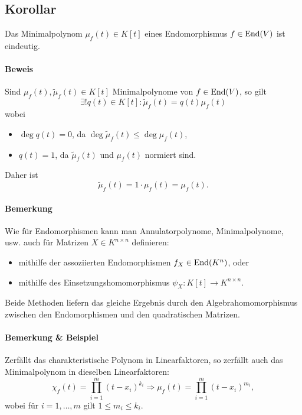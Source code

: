 \subsection{Korollar}
\begin{Korollar}
	Das Minimalpolynom $ \mu_f(t)\in K[t] $ eines Endomorphismus $ f\in \operatorname{End}(V) $ ist eindeutig.
\end{Korollar}
\paragraph{Beweis}
	Sind $ \mu_f(t),\tilde{\mu}_f(t)\in K[t] $ Minimalpolynome von $ f\in \operatorname{End}(V) $, so gilt
		\[ \exists! q(t)\in K[t] : \tilde{\mu}_f(t) = q(t)\mu_f(t) \] %
	wobei
		\begin{itemize}
			\item $ \deg q(t) = 0 $, da $ \deg \tilde{\mu}_f(t) \leq \deg \mu_f(t) $,
			\item $ q(t) = 1$, da $ \tilde{\mu}_f(t) $ und $ \mu_f(t) $ normiert sind.
		\end{itemize}
	Daher ist
		\[ \tilde{\mu}_f(t) = 1\cdot \mu_f(t) = \mu_f(t). \]
\paragraph{Bemerkung}
	Wie für Endomorphismen kann man Annulatorpolynome, Minimalpolynome, usw. auch für Matrizen $ X\in K^{n\times n} $ definieren:
		\begin{itemize}
			\item mithilfe der assoziierten Endomorphismen $ f_X\in \operatorname{End}(K^n) $, oder 
			\item mithilfe des Einsetzungshomomorphismus $ \psi_X: K[t] \to K^{n\times n}. $ %
		\end{itemize}
	Beide Methoden liefern das gleiche Ergebnis durch den Algebrahomomorphismus zwischen den Endomorphismen und den quadratischen Matrizen.

\paragraph{Bemerkung \& Beispiel}
	Zerfällt das charakteristische Polynom in Linearfaktoren, so zerfällt auch das Minimalpolynom in dieselben Linearfaktoren:
		\[ \chi_f(t)= \prod_{i=1}^{m}(t-x_i)^{k_i} \Rightarrow \mu_f(t) = \prod_{i=1}^{m}(t-x_i)^{m_i}, \]
	wobei für $ i= 1,\dots,m $ gilt $ 1\leq m_i\leq k_i $.
	
